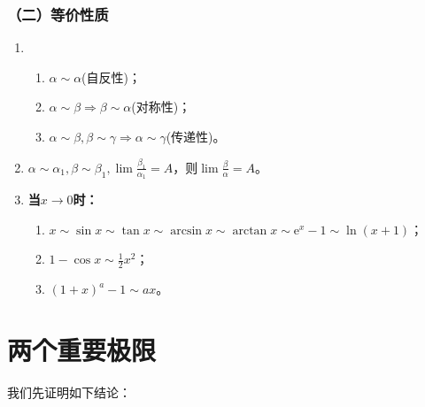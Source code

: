    \subsubsection*{（二）等价性质}
    \begin{enumerate}
        \item \begin{enumerate}
            \item $ \alpha \sim \alpha $(自反性)；
            \item $ \alpha \sim \beta \Rightarrow \beta \sim \alpha $(对称性)；
            \item $ \alpha \sim \beta , \beta \sim \gamma \Rightarrow \alpha \sim \gamma $(传递性)。
        \end{enumerate}
        \item $ \alpha \sim \alpha_1, \beta \sim \beta_1, \lim \displaystyle\frac{\beta_1}{\alpha_1} =A$，则$\lim \displaystyle\frac{\beta}{\alpha} =A$。
        \item \textbf{当$x \to 0$时：} \begin{enumerate}
            \item $x \sim \sin x \sim \tan x \sim \arcsin x \sim \arctan x \sim \mathrm{e}^x -1 \sim \ln{(x+1)}$；
            \item $1- \cos x \sim \displaystyle\frac{1}{2} x^2$；
            \item $(1+x)^a-1 \sim ax$。
        \end{enumerate}
    \end{enumerate}
    
    \section{两个重要极限}
    我们先证明如下结论：

